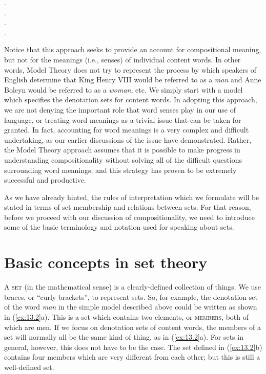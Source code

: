 \ea \label{ex:13.1}
.\\
.\\
.\\
.
                       \z
\z


Notice that this approach seeks to provide an account for compositional meaning, but not for the meanings (i.e., senses) of individual content words. In other words, Model Theory does not try to represent the process by which speakers of English determine that King Henry VIII would be referred to as a \textit{man} and Anne Boleyn would be referred to as a \textit{woman}, etc. We simply start with a model which specifies the denotation sets for content words. In adopting this approach, we are not denying the important role that word senses play in our use of language, or treating word meanings as a trivial issue that can be taken for granted. In fact, accounting for word meanings is a very complex and difficult undertaking, as our earlier discussions of the issue have demonstrated. Rather, the Model Theory approach assumes that it is possible to make progress in understanding compositionality without solving all of the difficult questions surrounding word meanings; and this strategy has proven to be extremely successful and productive.



As we have already hinted, the rules of interpretation which we formulate will be stated in terms of set membership and relations between sets. For that reason, before we proceed with our discussion of compositionality, we need to introduce some of the basic terminology and notation used for speaking about sets.


\section{Basic concepts in set theory}\label{sec:13.3}

A \textsc{set} (in the mathematical sense) is a clearly-defined collection of things. We use braces, or “curly brackets”, to represent sets. So, for example, the denotation set of the word \textit{man} in the simple model described above could be written as shown in (\ref{ex:13.2}a). This is a set which contains two elements, or \textsc{members}, both of which are men. If we focus on denotation sets of content words, the members of a set will normally all be the same kind of thing, as in (\ref{ex:13.2}a). For sets in general, however, this does not have to be the case. The set defined in (\ref{ex:13.2}b) contains four members which are very different from each other; but this is still a well-defined set.


